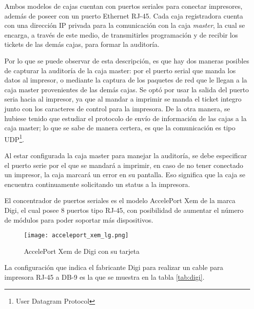 Ambos modelos de cajas cuentan con puertos seriales para conectar impresores, además de poseer con un puerto Ethernet RJ-45. Cada caja registradora cuenta con una dirección IP privada para la comunicación con la caja \textit{master}, la cual se encarga, a través de este medio, de transmitirles programación y de recibir los tickets de las demás cajas, para formar la auditoría. 

Por lo que se puede observar de esta descripción, es que hay dos maneras posibles de capturar la auditoría de la caja master: por el puerto serial que manda los datos al impresor, o mediante la captura de los paquetes de red que le llegan a la caja master provenientes de las demás cajas. Se optó por usar la salida del puerto seria hacia al impresor, ya que al mandar a imprimir se manda el ticket integro junto con los caracteres de control para la impresora. De la otra manera, se hubiese tenido que estudiar el protocolo de envío de información de las cajas a la caja master; lo que se sabe de manera certera, es que la comunicación es tipo UDP\footnote{User Datagram Protocol}.

Al estar configurada la caja master para manejar la auditoría, se debe especificar el puerto serie por el que se mandará a imprimir, en caso de no tener conectado un impresor, la caja marcará un error en su pantalla. Eso significa que la caja se encuentra continuamente solicitando un status a la impresora.

El concentrador de puertos seriales es el modelo AccelePort  Xem de la marca Digi, el cual posee 8 puertos tipo RJ-45, con posibilidad de aumentar el número de módulos para poder soportar más dispositivos.

\begin{figure}[htb]
 \begin{center}
  \texttt{[image: acceleport\_xem\_lg.png]}
 \end{center}
 \caption{AccelePort Xem de Digi con su tarjeta}
 \label{fig:digi}
\end{figure}

La configuración que indica el fabricante Digi para realizar un cable para impresora RJ-45 a DB-9 es la que se muestra en la tabla \ref{tab:digi}.

